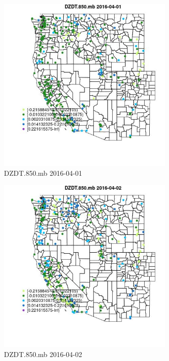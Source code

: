 \begin{figure} 
\centering  
\includegraphics[width=0.77\textwidth]{Code_Outputs/Report_ML_input_PM25_Step4_part_e_de_duplicated_aveswNAs_MapObsDZDT850mb2016-04-01.jpg} 
\caption{\label{fig:Report_ML_input_PM25_Step4_part_e_de_duplicated_aveswNAsMapObsDZDT850mb2016-04-01}DZDT.850.mb 2016-04-01} 
\end{figure} 
 

\clearpage 

\begin{figure} 
\centering  
\includegraphics[width=0.77\textwidth]{Code_Outputs/Report_ML_input_PM25_Step4_part_e_de_duplicated_aveswNAs_MapObsDZDT850mb2016-04-02.jpg} 
\caption{\label{fig:Report_ML_input_PM25_Step4_part_e_de_duplicated_aveswNAsMapObsDZDT850mb2016-04-02}DZDT.850.mb 2016-04-02} 
\end{figure} 
 

